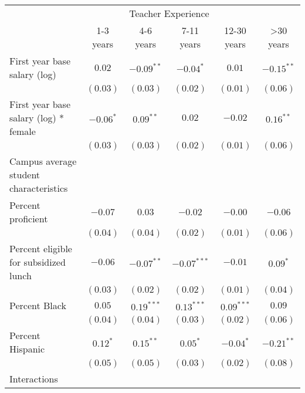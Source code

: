 \documentclass[12pt,]{article}
\begin{document}
\begin{table}
\begin{center}
\begin{tabular}{l c c c c c }
\hline
 & \multicolumn{4}{c}{Teacher Experience} \\ \cline{2-6}
 & 1-3 years & 4-6 years & 7-11 years & 12-30 years & >30 years \\
\hline
First year base salary (log)                & $0.02$       & $-0.09^{**}$  & $-0.04^{*}$   & $0.01$       & $-0.15^{**}$ \\
                                            & $(0.03)$     & $(0.03)$      & $(0.02)$      & $(0.01)$     & $(0.06)$     \\
First year base salary (log) * female       & $-0.06^{*}$  & $0.09^{**}$   & $0.02$        & $-0.02$      & $0.16^{**}$  \\
                                            & $(0.03)$     & $(0.03)$      & $(0.02)$      & $(0.01)$     & $(0.06)$     \\
Campus average student characteristics      &              &               &               &              &              \\
\quad Percent proficient                    & $-0.07$      & $0.03$        & $-0.02$       & $-0.00$      & $-0.06$      \\
                                            & $(0.04)$     & $(0.04)$      & $(0.02)$      & $(0.01)$     & $(0.06)$     \\
\quad Percent eligible for subsidized lunch & $-0.06$      & $-0.07^{**}$  & $-0.07^{***}$ & $-0.01$      & $0.09^{*}$   \\
                                            & $(0.03)$     & $(0.02)$      & $(0.02)$      & $(0.01)$     & $(0.04)$     \\
\quad Percent Black                         & $0.05$       & $0.19^{***}$  & $0.13^{***}$  & $0.09^{***}$ & $0.09$       \\
                                            & $(0.04)$     & $(0.04)$      & $(0.03)$      & $(0.02)$     & $(0.06)$     \\
\quad Percent Hispanic                      & $0.12^{*}$   & $0.15^{**}$   & $0.05^{*}$    & $-0.04^{*}$  & $-0.21^{**}$ \\
                                            & $(0.05)$     & $(0.05)$      & $(0.03)$      & $(0.02)$     & $(0.08)$     \\
Interactions                                &              &               &               &              &              \\

\end{tabular}
\end{center}
\end{table}
\end{document}
